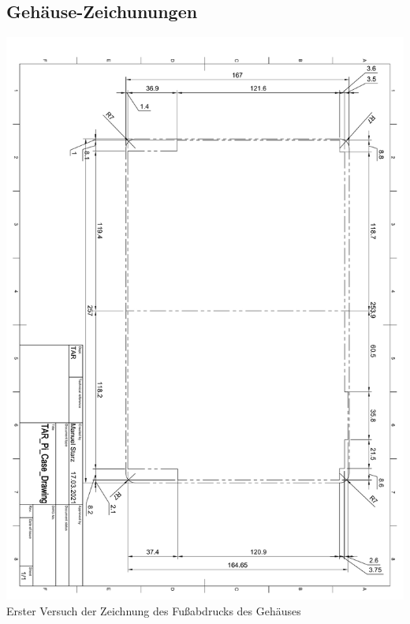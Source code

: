 \subsection{Gehäuse-Zeichunungen}\label{ah_gehaeuse}
\includegraphics*[width=1\textwidth,page=1]{pdf/gehäuse_zeichnung_fußabdruck_v1.pdf}
\label{fig:case_footprint}
Erster Versuch der Zeichnung des Fußabdrucks des Gehäuses
\newpage

